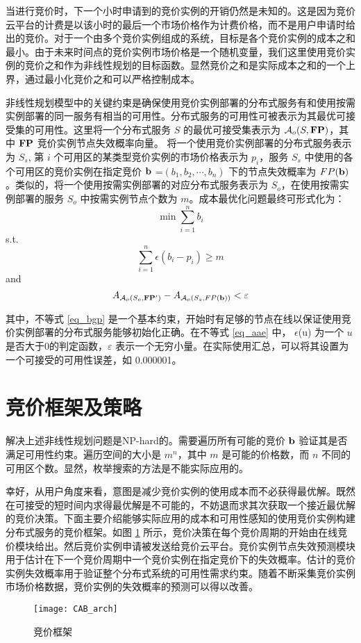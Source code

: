 当进行竞价时，下一个小时申请到的竞价实例的开销仍然是未知的。这是因为竞价云平台的计费是以该小时的最后一个市场价格作为计费价格，而不是用户申请时给出的竞价。对于一个由多个竞价实例组成的系统，目标是各个竞价实例的成本之和最小。由于未来时间点的竞价实例市场价格是一个随机变量，我们这里使用竞价实例的竞价之和作为非线性规划的目标函数。显然竞价之和是实际成本之和的一个上界，通过最小化竞价之和可以严格控制成本。

非线性规划模型中的关键约束是确保使用竞价实例部署的分布式服务有和使用按需实例部署的同一服务有相当的可用性。分布式服务的可用性可被表示为其最优可接受集的可用性。这里将一个分布式服务 $S$ 的最优可接受集表示为 $\mathcal{A}_{o}(S, \bf{FP})$，其中 $\bf{FP}$ 竞价实例节点失效概率向量。 将一个使用竞价实例部署的分布式服务表示为 $S_s$, 第 $i$ 个可用区的某类型竞价实例的市场价格表示为 $p_i$，服务 $S_s$ 中使用的各个可用区的竞价实例在指定竞价 $\bf b$ =$ (b_1, b_2, \cdots, b_n)$ 下的节点失效概率为 $FP(\bf b)$。类似的，将一个使用按需实例部署的对应分布式服务表示为 $S_o$，在使用按需实例部署的服务 $S_o$ 中按需实例节点个数为 $m$。成本最优化问题最终可形式化为：
\begin{equation}
\min \sum_{i=1}^n b_i
\end{equation}
s.t.
\begin{equation}\label{eq_bgp}
\sum_{i=1}^n {\epsilon(b_i - p_i)} \geq m
\end{equation}
and
\begin{equation}\label{eq_aae}
A_{\mathcal{A}_{o}(S_o, {\bf{FP^{\prime}}})} - A_{\mathcal{A}_{o}(S_s, FP(\bf b))} < \varepsilon
\end{equation}

其中，不等式 \eqref{eq_bgp} 是一个基本约束，开始时有足够的节点在线以保证使用竞价实例部署的分布式服务能够初始化正确。在不等式 \eqref{eq_aae} 中， $\epsilon$(u) 为一个 $u$ 是否大于0的判定函数，$\varepsilon$ 表示一个无穷小量。在实际使用汇总，可以将其设置为一个可接受的可用性误差，如 0.000001。

\section{竞价框架及策略}
\label{jupiter-framework}
解决上述非线性规划问题是NP-hard的。需要遍历所有可能的竞价 $\bf b$ 验证其是否满足可用性约束。遍历空间的大小是 $m^n$，其中 $m$ 是可能的价格数，而 $n$ 不同的可用区个数。显然，枚举搜索的方法是不能实际应用的。

幸好，从用户角度来看，意图是减少竞价实例的使用成本而不必获得最优解。既然在可接受的短时间内求得最优解是不可能的，不妨退而求其次获取一个接近最优解的竞价决策。下面主要介绍能够实际应用的成本和可用性感知的使用竞价实例构建分布式服务的竞价框架。如图 \ref{figure:framework} 所示，竞价决策在每个竞价周期的开始由在线竞价模块给出。然后竞价实例申请被发送给竞价云平台。竞价实例节点失效预测模块用于估计在下一个竞价周期中一个竞价实例在指定竞价下的失效概率。估计的竞价实例失效概率用于验证整个分布式系统的可用性需求约束。随着不断采集竞价实例市场价格数据，竞价实例的失效概率的预测可以得以改善。
\begin{figure}
  \centering
  \texttt{[image: CAB\_arch]}
  \caption{竞价框架}
  \label{figure:framework}
\end{figure}

